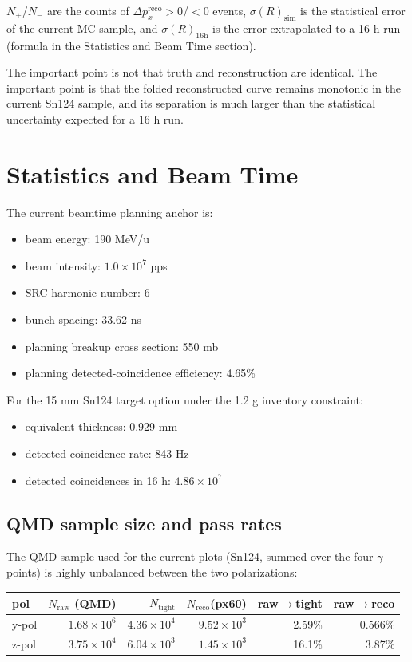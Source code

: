 \documentclass[a4paper,11pt]{article}
\begin{document}
$N_{+}$/$N_{-}$ are the counts of $\Delta p_x^{\mathrm{reco}}>0$/$<0$ events, $\sigma(R)_{\mathrm{sim}}$ is the statistical error of the current MC sample, and $\sigma(R)_{16\mathrm{h}}$ is the error extrapolated to a 16 h run (formula in the Statistics and Beam Time section).

The important point is not that truth and reconstruction are identical. The important point is that the folded reconstructed curve remains monotonic in the current Sn124 sample, and its separation is much larger than the statistical uncertainty expected for a 16 h run.

\section{Statistics and Beam Time}

The current beamtime planning anchor is:
\begin{itemize}
  \item beam energy: 190 MeV/u
  \item beam intensity: $1.0\times10^7$ pps
  \item SRC harmonic number: 6
  \item bunch spacing: 33.62 ns
  \item planning breakup cross section: 550 mb
  \item planning detected-coincidence efficiency: 4.65\%
\end{itemize}

For the 15 mm Sn124 target option under the 1.2 g inventory constraint:
\begin{itemize}
  \item equivalent thickness: 0.929 mm
  \item detected coincidence rate: 843 Hz
  \item detected coincidences in 16 h: $4.86\times10^7$
\end{itemize}

\subsection{QMD sample size and pass rates}

The QMD sample used for the current plots (Sn124, summed over the four $\gamma$ points) is highly unbalanced between the two polarizations:

\begin{table}[H]
\centering
\begin{tabular}{lrrrrr}
\toprule
pol & $N_{\mathrm{raw}}$ (QMD) & $N_{\mathrm{tight}}$ & $N_{\mathrm{reco}}$(px60) & raw$\to$tight & raw$\to$reco \\
\midrule
y-pol & $1.68\times10^6$ & $4.36\times10^4$ & $9.52\times10^3$ & 2.59\% & 0.566\% \\
z-pol & $3.75\times10^4$ & $6.04\times10^3$ & $1.45\times10^3$ & 16.1\% & 3.87\% \\
\bottomrule
\end{tabular}
\end{table}
\end{document}
